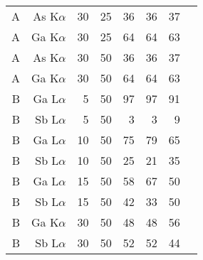 \begin{table}[phtb]
\begin{center}
\begin{tabular}{rrrrrrrr}
            A               & As K$\alpha$  & 30             & 25             & 36                               & 36                                 & 37                           \\
            A               & Ga K$\alpha$  & 30             & 25             & 64                               & 64                                 & 63                           \\
            A               & As K$\alpha$  & 30             & 50             & 36                               & 36                                 & 37                           \\
            A               & Ga K$\alpha$  & 30             & 50             & 64                               & 64                                 & 63                           \\
            \hline
            B               & Ga L$\alpha$  & 5              & 50             & 97                               & 97                                 & 91                           \\
            B               & Sb L$\alpha$  & 5              & 50             & 3                                & 3                                  & 9                            \\
            B               & Ga L$\alpha$  & 10             & 50             & 75                               & 79                                 & 65                           \\
            B               & Sb L$\alpha$  & 10             & 50             & 25                               & 21                                 & 35                           \\
            B               & Ga L$\alpha$  & 15             & 50             & 58                               & 67                                 & 50                           \\
            B               & Sb L$\alpha$  & 15             & 50             & 42                               & 33                                 & 50                           \\
            B               & Ga K$\alpha$  & 30             & 50             & 48                               & 48                                 & 56                           \\
            B               & Sb L$\alpha$  & 30             & 50             & 52                               & 52                                 & 44                           \\

\end{tabular}
\end{center}
\end{table}

